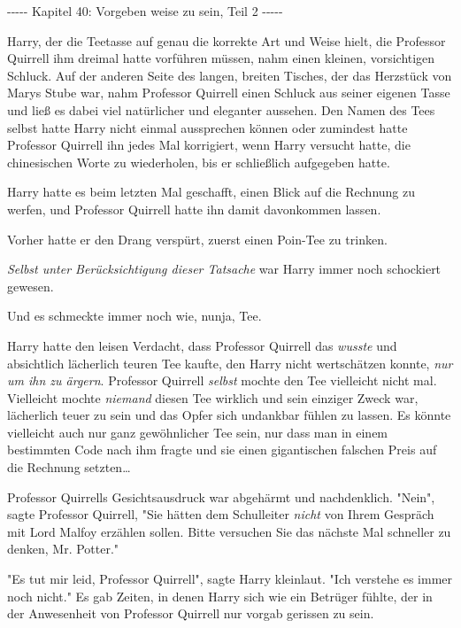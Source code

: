 

\hypertarget{vorgeben-weise-zu-sein-teil-2}{%

-\/-\/-\/-\/- Kapitel 40: Vorgeben weise zu sein, Teil 2 -\/-\/-\/-\/-

Harry, der die Teetasse auf genau die korrekte Art und Weise hielt, die Professor Quirrell ihm dreimal hatte vorführen müssen, nahm einen kleinen, vorsichtigen Schluck. Auf der anderen Seite des langen, breiten Tisches, der das Herzstück von Marys Stube war, nahm Professor Quirrell einen Schluck aus seiner eigenen Tasse und ließ es dabei viel natürlicher und eleganter aussehen. Den Namen des Tees selbst hatte Harry nicht einmal aussprechen können oder zumindest hatte Professor Quirrell ihn jedes Mal korrigiert, wenn Harry versucht hatte, die chinesischen Worte zu wiederholen, bis er schließlich aufgegeben hatte.

Harry hatte es beim letzten Mal geschafft, einen Blick auf die Rechnung zu werfen, und Professor Quirrell hatte ihn damit davonkommen lassen.

Vorher hatte er den Drang verspürt, zuerst einen Poin-Tee zu trinken.

\emph{Selbst unter Berücksichtigung dieser Tatsache} war Harry immer noch schockiert gewesen.

Und es schmeckte immer noch wie, nunja, Tee.

Harry hatte den leisen Verdacht, dass Professor Quirrell das \emph{wusste} und absichtlich lächerlich teuren Tee kaufte, den Harry nicht wertschätzen konnte, \emph{nur um ihn zu ärgern}. Professor Quirrell \emph{selbst} mochte den Tee vielleicht nicht mal. Vielleicht mochte \emph{niemand} diesen Tee wirklich und sein einziger Zweck war, lächerlich teuer zu sein und das Opfer sich undankbar fühlen zu lassen. Es könnte vielleicht auch nur ganz gewöhnlicher Tee sein, nur dass man in einem bestimmten Code nach ihm fragte und sie einen gigantischen falschen Preis auf die Rechnung setzten…

Professor Quirrells Gesichtsausdruck war abgehärmt und nachdenklich. "Nein", sagte Professor Quirrell, "Sie hätten dem Schulleiter \emph{nicht} von Ihrem Gespräch mit Lord Malfoy erzählen sollen. Bitte versuchen Sie das nächste Mal schneller zu denken, Mr. Potter."

"Es tut mir leid, Professor Quirrell", sagte Harry kleinlaut. "Ich verstehe es immer noch nicht." Es gab Zeiten, in denen Harry sich wie ein Betrüger fühlte, der in der Anwesenheit von Professor Quirrell nur vorgab gerissen zu sein.

}
